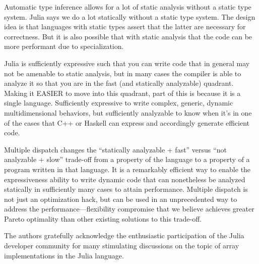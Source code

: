 \documentclass[preprint]{sigplanconf}
\begin{document}
Automatic type inference allows for a lot of static analysis without a static
type system. Julia says we do a lot statically without a static type system.
The design idea is that languages with static types assert that the latter are
necessary for correctness. But it is also possible that with static analysis
that the code can be more performant due to specialization.

Julia is sufficiently expressive such that you can write code that in general
may not be amenable to static analysis, but in many cases the compiler is able
to analyze it so that you are in the fast (and statically analyzable)
quadrant. Making it EASIER to move into this quadrant, part of this is because
it is a single language. Sufficiently expressive to write complex, generic,
dynamic multidimensional behaviors, but sufficiently analyzable to know when
it's in one of the cases that C++ or Haskell can express and accordingly
generate efficient code.

Multiple dispatch changes the ``statically analyzable + fast'' versus ``not
analyzable + slow'' trade-off from a property of the language to a property of
a program written in that language. It is a remarkably efficient way to enable
the expressiveness ability to write dynamic code that can nonetheless be
analyzed statically in sufficiently many cases to attain performance. Multiple
dispatch is not just an optimization hack, but can be used in an unprecedented
way to address the performance---flexibility compromise that we believe
achieves greater Pareto optimality than other existing solutions to this
trade-off.

%

\acks

The authors gratefully acknowledge the enthusiastic participation of the Julia
developer community for many stimulating discussions on the topic of array
implementations in the Julia language.



{}





\end{document}
